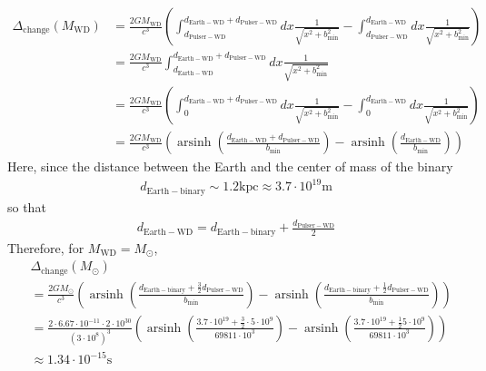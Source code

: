 \documentclass[12pt]{article}
\begin{document}
\begin{align}
\Delta_{\mathrm{change}}(M_{\mathrm{WD}}) &= \frac{2 G M_{\mathrm{WD}}}{c^3} \left(\int^{d_{\mathrm{Earth-WD}} + d_{\mathrm{Pulser-WD}}}_{d_{\mathrm{Pulser-WD}}} dx \frac{1}{\sqrt{x^2 + b_{\mathrm{min}}^2}} - \int^{d_{\mathrm{Earth-WD}}}_{d_{\mathrm{Pulser-WD}}} dx \frac{1}{\sqrt{x^2 + b_{\mathrm{min}}^2}}\right)\\
&= \frac{2 G M_{\mathrm{WD}}}{c^3} \int^{d_{\mathrm{Earth-WD}} + d_{\mathrm{Pulser-WD}}}_{d_{\mathrm{Earth-WD}}} dx \frac{1}{\sqrt{x^2 + b_{\mathrm{min}}^2}} \\
&= \frac{2 G M_{\mathrm{WD}}}{c^3} \left(\int^{d_{\mathrm{Earth-WD}} + d_{\mathrm{Pulser-WD}}}_{0} dx \frac{1}{\sqrt{x^2 + b_{\mathrm{min}}^2}} - \int^{d_{\mathrm{Earth-WD}}}_{0} dx \frac{1}{\sqrt{x^2 + b_{\mathrm{min}}^2}} \right) \\
&= \frac{2 G M_{\mathrm{WD}}}{c^3} \left(\operatorname{arsinh}\left(\frac{d_{\mathrm{Earth-WD}} + d_{\mathrm{Pulser-WD}}}{b_{\mathrm{min}}}\right) -  \operatorname{arsinh}\left(\frac{d_{\mathrm{Earth-WD}}}{b_{\mathrm{min}}}\right) \right)
\end{align}
Here, since the distance between the Earth and the center of mass of the binary
\begin{align}
d_{\mathrm{Earth-binary}} \sim 1.2 \mathrm{kpc} \approx 3.7 \cdot 10^{19} \mathrm{m}
\end{align}
so that
\begin{align}
d_{\mathrm{Earth-WD}} = d_{\mathrm{Earth-binary}} + \frac{d_{\mathrm{Pulser-WD}}}{2}
\end{align}
Therefore, for $M_{\mathrm{WD}} = M_{\odot}$,
\begin{align}
&\Delta_{\mathrm{change}}(M_{\odot}) \nonumber\\
&= \frac{2 G M_{\odot}}{c^3} \left(\operatorname{arsinh}\left(\frac{d_{\mathrm{Earth-binary}} + \frac{3}{2}d_{\mathrm{Pulser-WD}}}{b_{\mathrm{min}}}\right) -  \operatorname{arsinh}\left(\frac{d_{\mathrm{Earth-binary}} + \frac{1}{2} d_{\mathrm{Pulser-WD}}}{b_{\mathrm{min}}}\right) \right) \nonumber \\
&= \frac{2 \cdot 6.67 \cdot 10^{-11} \cdot 2 \cdot 10^{30}}{(3 \cdot 10^{8})^3} \left(\operatorname{arsinh}\left(\frac{3.7 \cdot 10^{19} + \frac{3}{2} \cdot 5 \cdot 10^{9}}{69811 \cdot 10^{3}}\right) -  \operatorname{arsinh}\left(\frac{3.7 \cdot 10^{19} + \frac{1}{2} 5 \cdot 10^{9}}{69811 \cdot 10^{3}}\right) \right) \\
&\approx 1.34 \cdot 10^{-15} \mathrm{s}
\end{align}
\end{document}
